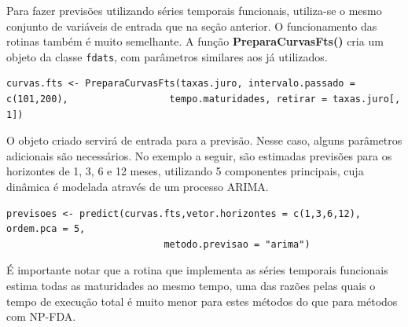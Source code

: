 \documentclass[
	12pt,				%
	openright,			%
	oneside,			%
	a4paper,			%
	english,			%
	brazil				%
	]{dissertacao-ufrgs-abntex2}
\begin{document}
\begin{apendicesenv}
Para fazer previsões utilizando séries temporais funcionais, utiliza-se o mesmo conjunto de variáveis de entrada que na seção anterior. O funcionamento das rotinas também é muito semelhante. A função \textbf{PreparaCurvasFts()} cria um objeto da classe \texttt{fdats}, com parâmetros similares aos já utilizados.
\begin{lstlisting} 
curvas.fts <- PreparaCurvasFts(taxas.juro, intervalo.passado = c(101,200), 					tempo.maturidades, retirar = taxas.juro[, 1])
\end{lstlisting} 
O objeto criado servirá de entrada para a previsão. Nesse caso, alguns parâmetros adicionais são necessários. No exemplo a seguir, são estimadas previsões para os horizontes de 1, 3, 6 e 12 meses, utilizando 5 componentes principais, cuja dinâmica é modelada através de um processo ARIMA. 
\begin{lstlisting} 
previsoes <- predict(curvas.fts,vetor.horizontes = c(1,3,6,12), ordem.pca = 5, 
							metodo.previsao = "arima")
\end{lstlisting}
É importante notar que a rotina que implementa as séries temporais funcionais estima todas as maturidades ao mesmo tempo, uma das razões pelas quais o tempo de execução total é muito menor para estes métodos do que para métodos com NP-FDA.


\end{apendicesenv}
%
%
%
%
%
%
%





\printindex
\end{document}
